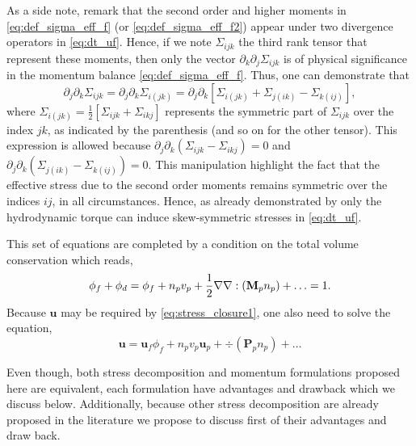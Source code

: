 As a side note, remark that the second order and higher moments in \ref{eq:def_sigma_eff_f} (or \ref{eq:def_sigma_eff_f2}) appear under two divergence operators in \ref{eq:dt_uf}. 
Hence, if we note $\Sigma_{ijk}$ the third rank tensor that represent these moments, then only the vector $\partial_k \partial_j\Sigma_{ijk}$ is of physical significance in the momentum balance \eqref{eq:def_sigma_eff_f}.
Thus, one can demonstrate that \citep{lhuillier1996contribution}
\begin{equation}
    \partial_j \partial_k \Sigma_{ijk}
    = \partial_j \partial_k \Sigma_{i(jk)}
    =
    \partial_j \partial_k \left[
        \Sigma_{i(jk)}
        + \Sigma_{j(ik)}
        - \Sigma_{k(ij)}
    \right],
    \label{eq:sym_proof}
\end{equation}
where $\Sigma_{i(jk)} = \frac{1}{2}[\Sigma_{ijk} + \Sigma_{ikj}]$ represents the symmetric part of $\Sigma_{ijk}$ over the index $jk$, as indicated by the parenthesis (and so on for the other tensor). 
This expression is allowed because $\partial_j \partial_k (\Sigma_{ijk} - \Sigma_{ikj}) = 0$ and $\partial_j \partial_k (\Sigma_{j(ik)} - \Sigma_{k(ij)}) = 0$. 
This manipulation highlight the fact that the effective stress due to the second order moments remains symmetric over the indices $ij$, in all circumstances.
Hence, as already demonstrated by \citet{lhuillier1996contribution} only the hydrodynamic torque can induce skew-symmetric stresses in \ref{eq:dt_uf}. 




This set of equations are completed by a condition on the total volume conservation which reads, 
\begin{equation}
    \phi_f + \phi_d = 
    \phi_f +  n_pv_p + \frac{1}{2}\grad\grad : (\textbf{M}_p n_p) + \ldots = 1. 
    \label{eq:volume_conservation}
\end{equation}
Because $\textbf{u}$ may be required by \ref{eq:stress_closure1}, one also need to solve the equation, 
\begin{equation}
    \textbf{u} = \textbf{u}_f\phi_f + 
    n_pv_p\textbf{u}_p + \div  (\textbf{P}_p n_p) + \ldots
    \label{eq:velocity_conservation}
\end{equation}

Even though, both stress decomposition and momentum formulations proposed here are equivalent, each formulation have advantages and drawback which we discuss below.  
Additionally, because other stress decomposition are already proposed in the literature we propose to discuss first of their advantages and draw back. 


